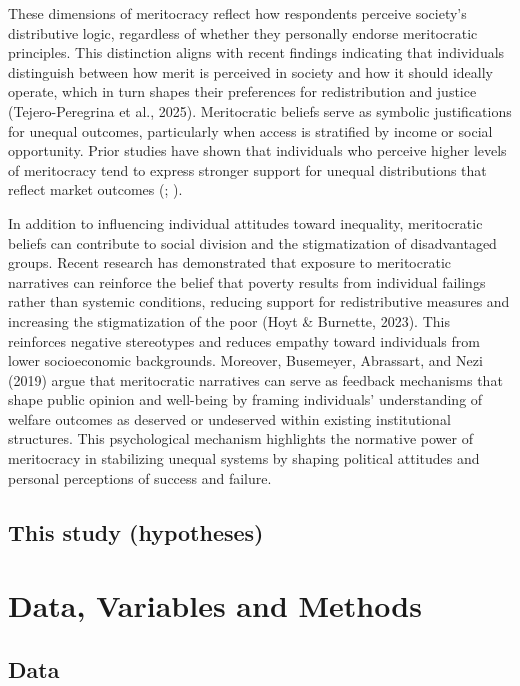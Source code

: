 \documentclass[
  12pt,
]{article}
\begin{document}
These dimensions of meritocracy reflect how respondents perceive
society's distributive logic, regardless of whether they personally
endorse meritocratic principles. This distinction aligns with recent
findings indicating that individuals distinguish between how merit is
perceived in society and how it should ideally operate, which in turn
shapes their preferences for redistribution and justice
(Tejero-Peregrina et al., 2025). Meritocratic beliefs serve as symbolic
justifications for unequal outcomes, particularly when access is
stratified by income or social opportunity. Prior studies have shown
that individuals who perceive higher levels of meritocracy tend to
express stronger support for unequal distributions that reflect market
outcomes (; ).

In addition to influencing individual attitudes toward inequality,
meritocratic beliefs can contribute to social division and the
stigmatization of disadvantaged groups. Recent research has demonstrated
that exposure to meritocratic narratives can reinforce the belief that
poverty results from individual failings rather than systemic
conditions, reducing support for redistributive measures and increasing
the stigmatization of the poor (Hoyt \& Burnette, 2023). This reinforces
negative stereotypes and reduces empathy toward individuals from lower
socioeconomic backgrounds. Moreover, Busemeyer, Abrassart, and Nezi
(2019) argue that meritocratic narratives can serve as feedback
mechanisms that shape public opinion and well-being by framing
individuals' understanding of welfare outcomes as deserved or undeserved
within existing institutional structures. This psychological mechanism
highlights the normative power of meritocracy in stabilizing unequal
systems by shaping political attitudes and personal perceptions of
success and failure.

\subsection{This study (hypotheses)}\label{this-study-hypotheses}

\section{Data, Variables and Methods}\label{data-variables-and-methods}

\subsection{Data}\label{data}
\end{document}
